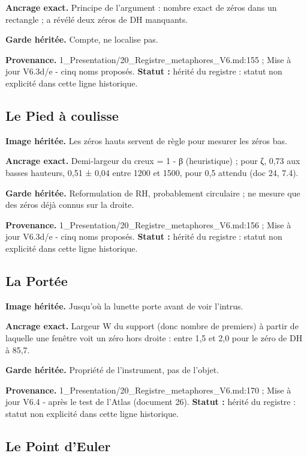 \documentclass[
  9pt,
  a4paper,
]{article}
\begin{document}
\textbf{Ancrage exact.} Principe de l'argument : nombre exact de zéros
dans un rectangle ; a révélé deux zéros de DH manquants.

\textbf{Garde héritée.} Compte, ne localise pas.

\textbf{Provenance.} 1\_Presentation/20\_Registre\_metaphores\_V6.md:155
; Mise à jour V6.3d/e - cinq noms proposés. \textbf{Statut :} hérité du
registre : statut non explicité dans cette ligne historique.

\hypertarget{le-pied-uxe0-coulisse}{%
\subsection{Le Pied à coulisse}\label{le-pied-uxe0-coulisse}}

\textbf{Image héritée.} Les zéros hauts servent de règle pour mesurer
les zéros bas.

\textbf{Ancrage exact.} Demi-largeur du creux = 1 - β (heuristique) ;
pour ζ, 0,73 aux basses hauteurs, 0,51 ± 0,04 entre 1200 et 1500, pour
0,5 attendu (doc 24, 7.4).

\textbf{Garde héritée.} Reformulation de RH, probablement circulaire ;
ne mesure que des zéros déjà connus sur la droite.

\textbf{Provenance.} 1\_Presentation/20\_Registre\_metaphores\_V6.md:156
; Mise à jour V6.3d/e - cinq noms proposés. \textbf{Statut :} hérité du
registre : statut non explicité dans cette ligne historique.

\hypertarget{la-portuxe9e}{%
\subsection{La Portée}\label{la-portuxe9e}}

\textbf{Image héritée.} Jusqu'où la lunette porte avant de voir
l'intrus.

\textbf{Ancrage exact.} Largeur W du support (donc nombre de premiers) à
partir de laquelle une fenêtre voit un zéro hors droite : entre 1,5 et
2,0 pour le zéro de DH à 85,7.

\textbf{Garde héritée.} Propriété de l'instrument, pas de l'objet.

\textbf{Provenance.} 1\_Presentation/20\_Registre\_metaphores\_V6.md:170
; Mise à jour V6.4 - après le test de l'Atlas (document 26).
\textbf{Statut :} hérité du registre : statut non explicité dans cette
ligne historique.

\hypertarget{le-point-deuler}{%
\subsection{Le Point d'Euler}\label{le-point-deuler}}
\end{document}

